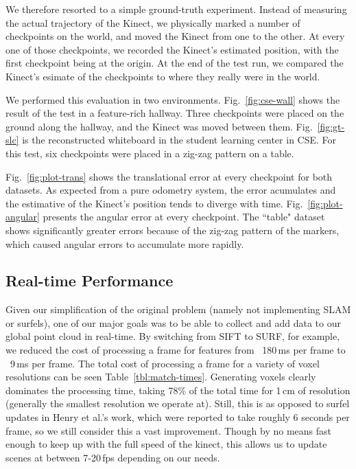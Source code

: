 \documentclass[letterpaper, 10pt, conference]{ieeeconf}
\begin{document}
We therefore resorted to a simple ground-truth experiment. Instead of measuring the actual trajectory of
the Kinect, we physically marked a number of checkpoints on the world,
and moved the Kinect from one to the other. At every one of those checkpoints, we recorded the
Kinect's estimated position, with the first checkpoint being at the origin. At the end of the
test run, we compared the Kinect's esimate of the checkpoints to where they really were in the
world.

We performed this evaluation in two environments. Fig.~\ref{fig:cse-wall} shows the result of the test
in a feature-rich hallway. Three checkpoints were placed on the ground along the hallway, and the Kinect was
moved between them. Fig.~\ref{fig:gt-slc} is the reconstructed whiteboard in the student learning
center in CSE. For this test, six checkpoints were placed in a zig-zag pattern on a table.

Fig.~\ref{fig:plot-trans} shows the translational error at every checkpoint for both datasets.
As expected from a pure odometry system, the error acumulates and the estimative of the Kinect's
position tends to diverge with time. Fig.~\ref{fig:plot-angular} presents the angular error at
every checkpoint. The ``table" dataset shows significantly greater errors because of the
zig-zag pattern of the markers, which caused angular errors to accumulate more rapidly.
\subsection{Real-time Performance}
Given our simplification of the original problem (namely not implementing SLAM
or surfels), one of our major goals was to be able to collect and add data to
our global point cloud in real-time. By switching from SIFT to SURF, for
example, we reduced the cost of processing a frame for features from
~180\,ms per frame to ~9\,ms per frame. The total cost of processing a frame
for a variety of voxel resolutions
can be seen Table~\ref{tbl:match-times}. Generating voxels clearly dominates the
processing time, taking 78\% of the total time for 1\,cm of resolution
(generally the smallest resolution we operate at). Still, this is as opposed
to surfel updates in Henry et al.'s work, which were reported to take roughly
6 seconds per frame, so we still consider this a vast improvement. Though by
no means fast enough to keep up with the full speed of the kinect, this allows
us to update scenes at between 7-20\,fps depending on our needs.
\end{document}
